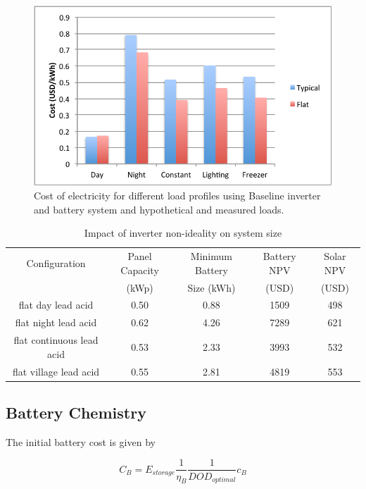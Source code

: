 \documentclass[conference]{IEEEtran}
\begin{document}
\begin{figure}[]
\begin{center}
\includegraphics[width=\columnwidth]{figures/inverter.pdf}
\end{center}
\caption{Cost of electricity for different load profiles using Baseline 
inverter and battery system and hypothetical and measured loads.}
\label{fig_inverter}
\end{figure}


\begin{table}
\centering
\begin{tabular}{c c c c c}
Configuration & Panel Capacity & Minimum Battery & Battery NPV & Solar NPV \\
              & (kWp)          & Size (kWh)      & (USD)       & (USD)     \\
\hline
flat day lead acid             & 0.50 & 0.88 & 1509 & 498 \\
flat night lead acid           & 0.62 & 4.26 & 7289 & 621 \\
flat continuous lead acid      & 0.53 & 2.33 & 3993 & 532 \\
flat village lead acid         & 0.55 & 2.81 & 4819 & 553 \\
\end{tabular}
\caption{Impact of inverter non-ideality on system size}
\label{table_inverter}
\end{table}

\subsection{Battery Chemistry}

The initial battery cost is given by

$$ C_B = E_{storage} \frac{1}{\eta_B} \frac{1}{DOD_{optimal}} c_B $$
\end{document}
